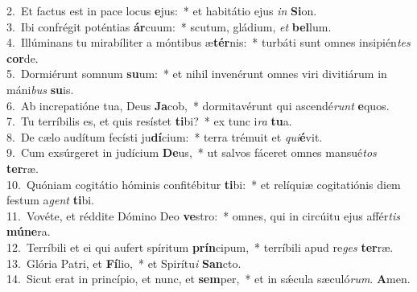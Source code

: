 {2.~}Et factus est in pace locus \textbf{e}jus:~* et habitátio ejus \textit{in} \textbf{Si}on.\\
{3.~}Ibi confrégit poténtias \textbf{ár}cuum:~* scutum, gládium, \textit{et} \textbf{bel}lum.\\
{4.~}Illúminans tu mirabíliter a móntibus æ\textbf{tér}nis:~* turbáti sunt omnes insipién\textit{tes} \textbf{cor}de.\\
{5.~}Dormiérunt somnum \textbf{su}um:~* et nihil invenérunt omnes viri divitiárum in máni\textit{bus} \textbf{su}is.\\
{6.~}Ab increpatióne tua, Deus \textbf{Ja}cob,~* dormitavérunt qui ascendé\textit{runt} \textbf{e}quos.\\
{7.~}Tu terríbilis es, et quis resístet \textbf{ti}bi?~* ex tunc i\textit{ra} \textbf{tu}a.\\
{8.~}De cælo audítum fecísti ju\textbf{dí}cium:~* terra trémuit et \textit{qui}\textbf{é}vit.\\
{9.~}Cum exsúrgeret in judícium \textbf{De}us,~* ut salvos fáceret omnes mansué\textit{tos} \textbf{ter}ræ.\\
{10.~}Quóniam cogitátio hóminis confitébitur \textbf{ti}bi:~* et relíquiæ cogitatiónis diem festum a\textit{gent} \textbf{ti}bi.\\
{11.~}Vovéte, et réddite Dómino Deo \textbf{ve}stro:~* omnes, qui in circúitu ejus affér\textit{tis} \textbf{mú}\textbf{ne}ra.\\
{12.~}Terríbili et ei qui aufert spíritum \textbf{prín}cipum,~* terríbili apud re\textit{ges} \textbf{ter}ræ.\\
{13.~}Glória Patri, et \textbf{Fí}lio,~* et Spirítu\textit{i} \textbf{San}cto.\\
{14.~}Sicut erat in princípio, et nunc, et \textbf{sem}per,~* et in sǽcula sæculó\textit{rum}. \textbf{A}men.\\
